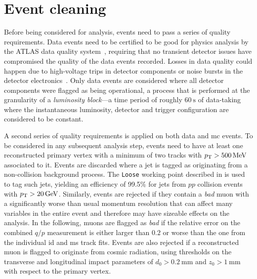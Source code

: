 \section{Event cleaning}

Before being considered for analysis, events need to pass a series of quality requirements. Data events need to be certified to be good for physics analysis by the ATLAS data quality system~\cite{DAPR-2018-01}, requiring that no transient detector issues have compromised the quality of the data events recorded. Losses in data quality could happen due to \eg high-voltage trips in detector components or noise bursts in the detector electronics~\cite{DAPR-2018-01}. Only data events are considered where all detector components were flagged as being operational, a process that is performed at the granularity of a \textit{luminosity block}---a time period of roughly $\SI{60}{\second}$ of data-taking where the instantaneous luminosity, detector and trigger configuration are considered to be constant. 

A second series of quality requirements is applied on both data and \gls{mc} events. To be considered in any subsequent analysis step, events need to have at least one reconstructed primary vertex with a minimum of two tracks with $\pt > \SI{500}{\MeV}$ associated to it. Events are discarded where a jet is tagged as originating from a non-collision background process. The \texttt{Loose} working point described in \cite{ATLAS-CONF-2015-029} is used to tag such jets, yielding an efficiency of 99.5\% for jets from $pp$ collision events with $\pt>\SI{20}{\GeV}$. Similarly, events are rejected if they contain a \textit{bad} muon with a significantly worse than usual momentum resolution that can affect many variables in the entire event and therefore may have sizeable effects on the analysis. In the following, muons are flagged as \textit{bad} if the relative error on the combined $q/p$ measurement is either larger than $0.2$ or worse than the one from the individual \gls{id} and \gls{ms} track fits. Events are also rejected if a reconstructed muon is flagged to originate from cosmic radiation, using thresholds on the transverse and longitudinal impact parameters of $d_0 > \SI{0.2}{\milli\meter}$ and $z_0 > \SI{1}{\milli\meter}$ with respect to the primary vertex.



